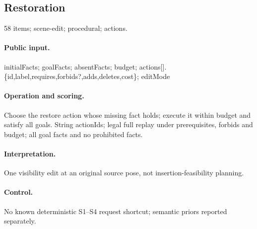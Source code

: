 \subsection{Restoration}
58 items; scene-edit; procedural; actions.
\paragraph{Public input.}initialFacts; goalFacts; absentFacts; budget; actions[].\{id,label,requires,forbids?,adds,deletes,cost\}; editMode
\paragraph{Operation and scoring.}Choose the restore action whose missing fact holds; execute it within budget and satisfy all goals. String actionIds; legal full replay under prerequisites, forbids and budget; all goal facts and no prohibited facts.
\paragraph{Interpretation.}One visibility edit at an original source pose, not insertion-feasibility planning.
\paragraph{Control.}No known deterministic S1--S4 request shortcut; semantic priors reported separately.

